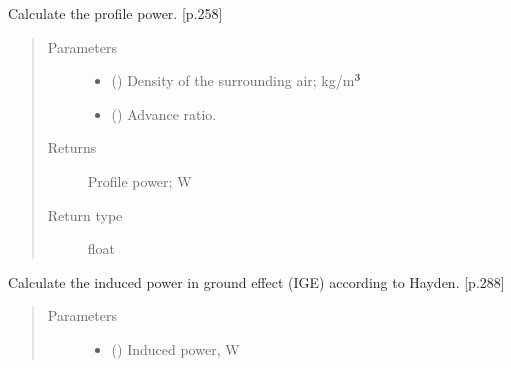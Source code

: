 \documentclass[letterpaper,10pt,english]{sphinxmanual}
\begin{document}
\begin{fulllineitems}
\begin{fulllineitems}
\label{\detokenize{modules/rotor:rotor.Rotor.get_profile_power}}
\sphinxAtStartPar
Calculate the profile power. {[}p.258{]}
\begin{quote}\begin{description}
\item[{Parameters}] \leavevmode\begin{itemize}
\item {} 
\sphinxAtStartPar
{} () \textendash{} Density of the surrounding air; kg/m\(\sp{\text{3}}\)

\item {} 
\sphinxAtStartPar
{} () \textendash{} Advance ratio.

\end{itemize}

\item[{Returns}] \leavevmode
\sphinxAtStartPar
Profile power; W

\item[{Return type}] \leavevmode
\sphinxAtStartPar
float

\end{description}\end{quote}

\end{fulllineitems}


\begin{fulllineitems}
\label{\detokenize{modules/rotor:rotor.Rotor.in_ground_effect}}
\sphinxAtStartPar
Calculate the induced power in ground effect (IGE) according to Hayden.
{[}p.288{]}
\begin{quote}\begin{description}
\item[{Parameters}] \leavevmode\begin{itemize}
\item {} 
\sphinxAtStartPar
{} () \textendash{} Induced power, W


\end{itemize}
\end{description}
\end{quote}
\end{fulllineitems}
\end{fulllineitems}
\end{document}
